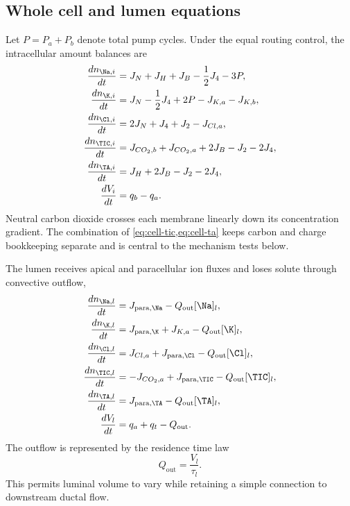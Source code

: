 \subsection{Whole cell and lumen equations}

Let $P=P_a+P_b$ denote total pump cycles. Under the equal routing control, the intracellular amount balances are
\begin{align}
\frac{dn_{\Na,i}}{dt}&=J_N+J_H+J_B-\frac12J_4-3P,
\label{eq:cell-na}\\
\frac{dn_{\K,i}}{dt}&=J_N-\frac12J_4+2P-J_{K,a}-J_{K,b},
\label{eq:cell-k}\\
\frac{dn_{\Cl,i}}{dt}&=2J_N+J_4+J_2-J_{Cl,a},
\label{eq:cell-cl}\\
\frac{dn_{\TIC,i}}{dt}&=J_{CO_2,b}+J_{CO_2,a}+2J_B-J_2-2J_4,
\label{eq:cell-tic}\\
\frac{dn_{\TA,i}}{dt}&=J_H+2J_B-J_2-2J_4,
\label{eq:cell-ta}\\
\frac{dV_i}{dt}&=q_b-q_a.
\label{eq:cell-volume}
\end{align}
Neutral carbon dioxide crosses each membrane linearly down its concentration gradient. The combination of \cref{eq:cell-tic,eq:cell-ta} keeps carbon and charge bookkeeping separate and is central to the mechanism tests below.

The lumen receives apical and paracellular ion fluxes and loses solute through convective outflow,
\begin{align}
\frac{dn_{\Na,l}}{dt}&=J_{\mathrm{para},\Na}-Q_{\mathrm{out}}[\Na]_l,
\label{eq:lumen-na}\\
\frac{dn_{\K,l}}{dt}&=J_{\mathrm{para},\K}+J_{K,a}-Q_{\mathrm{out}}[\K]_l,
\label{eq:lumen-k}\\
\frac{dn_{\Cl,l}}{dt}&=J_{Cl,a}+J_{\mathrm{para},\Cl}-Q_{\mathrm{out}}[\Cl]_l,
\label{eq:lumen-cl}\\
\frac{dn_{\TIC,l}}{dt}&=-J_{CO_2,a}+J_{\mathrm{para},\TIC}-Q_{\mathrm{out}}[\TIC]_l,
\label{eq:lumen-tic}\\
\frac{dn_{\TA,l}}{dt}&=J_{\mathrm{para},\TA}-Q_{\mathrm{out}}[\TA]_l,
\label{eq:lumen-ta}\\
\frac{dV_l}{dt}&=q_a+q_t-Q_{\mathrm{out}}.
\label{eq:lumen-volume}
\end{align}
The outflow is represented by the residence time law
\begin{equation}
\label{eq:outflow}
Q_{\mathrm{out}}=\frac{V_l}{\tau_l}.
\end{equation}
This permits luminal volume to vary while retaining a simple connection to downstream ductal flow.

